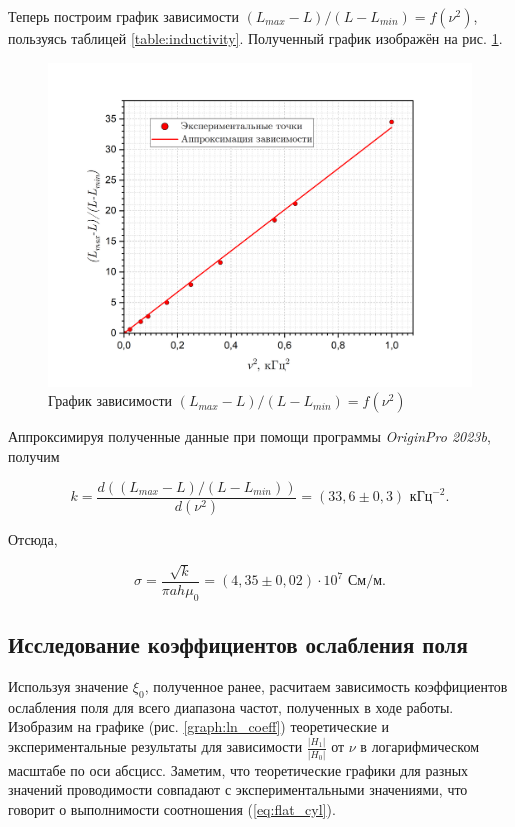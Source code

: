 \documentclass[a4paper, 12pt]{article}
\begin{document}
    Теперь построим график зависимости $(L_{max} - L) / (L - L_{min}) = f(\nu^2)$, пользуясь таблицей \ref{table:inductivity}. Полученный график изображён на рис. \ref{graph:rel_l_nu}.

     \begin{figure}[H]
        \centering
        \includegraphics[width = 14 cm]{images/graph_rel_l_nu.png}
        \caption{График зависимости $(L_{max} - L) / (L - L_{min}) = f(\nu^2)$}
        \label{graph:rel_l_nu}
    \end{figure}

    Аппроксимируя полученные данные при помощи программы \textit{OriginPro 2023b}, получим 

    \begin{equation*}
        k = \frac{d((L_{max} - L) / (L - L_{min}))}{d(\nu^2)} = \left( 33,6 \pm 0,3 \right) \text{ кГц}^{-2}.
    \end{equation*}

    Отсюда,

    \begin{equation*}
        \boxed{\sigma = \frac{\sqrt{k}}{\pi ah \mu_0} = \left( 4,35 \pm 0,02 \right) \cdot 10^7 \text{ См/м}}.
    \end{equation*}

    \subsection{Исследование коэффициентов ослабления поля}

        Используя значение $\xi_0$, полученное ранее, расчитаем зависимость коэффициентов ослабления поля для всего диапазона частот, полученных в ходе работы. Изобразим на графике (рис. \ref{graph:ln_coeff}) теоретические и экспериментальные результаты для зависимости $\frac{\lvert H_1 \rvert}{\lvert H_0 \rvert}$ от $\nu$ в логарифмическом масштабе по оси абсцисс. Заметим, что теоретические графики для разных значений проводимости совпадают с экспериментальными значениями, что говорит о выполнимости соотношения (\ref{eq:flat_cyl}).
\end{document}
